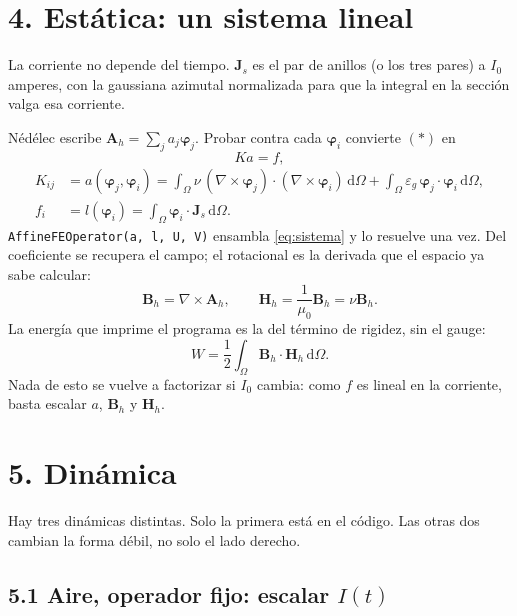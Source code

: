 \documentclass[11pt]{article}
\newcommand{\curl}{\nabla\times}
\newcommand{\nv}{\nu}
\newcommand{\eg}{\varepsilon_{g}}
\newcommand{\dV}{\,\mathrm{d}\Omega}
\begin{document}
\section*{4. Estática: un sistema lineal}

La corriente no depende del tiempo. \(\mathbf{J}_{s}\) es el par de anillos (o los tres pares) a \(I_{0}\) amperes, con la gaussiana azimutal normalizada para que la integral en la sección valga esa corriente.

Nédélec escribe \(\mathbf{A}_{h}=\sum_{j} a_{j}\boldsymbol{\varphi}_{j}\).
Probar contra cada \(\boldsymbol{\varphi}_{i}\) convierte \((\ast)\) en
\begin{equation}
Ka=f,
\label{eq:sistema}
\end{equation}
\begin{align}
K_{ij}
&=a(\boldsymbol{\varphi}_{j},\boldsymbol{\varphi}_{i})
=\int_{\Omega}\nv\,(\curl\boldsymbol{\varphi}_{j})\cdot(\curl\boldsymbol{\varphi}_{i})\dV
+\int_{\Omega}\eg\,\boldsymbol{\varphi}_{j}\cdot\boldsymbol{\varphi}_{i}\dV,
\label{eq:K}\\
f_{i}
&=l(\boldsymbol{\varphi}_{i})
=\int_{\Omega}\boldsymbol{\varphi}_{i}\cdot\mathbf{J}_{s}\dV.
\label{eq:f}
\end{align}
\texttt{AffineFEOperator(a, l, U, V)} ensambla \eqref{eq:sistema} y lo resuelve una vez. Del coeficiente se recupera el campo; el rotacional es la derivada que el espacio ya sabe calcular:
\begin{equation}
\mathbf{B}_{h}=\curl\mathbf{A}_{h},
\qquad
\mathbf{H}_{h}=\frac{1}{\mu_{0}}\mathbf{B}_{h}=\nv\mathbf{B}_{h}.
\label{eq:BH}
\end{equation}
La energía que imprime el programa es la del término de rigidez, sin el gauge:
\begin{equation}
W=\frac12\int_{\Omega}\mathbf{B}_{h}\cdot\mathbf{H}_{h}\dV.
\label{eq:energia}
\end{equation}
Nada de esto se vuelve a factorizar si \(I_{0}\) cambia: como \(f\) es lineal en la corriente, basta escalar \(a\), \(\mathbf{B}_{h}\) y \(\mathbf{H}_{h}\).

\section*{5. Dinámica}

Hay tres dinámicas distintas. Solo la primera está en el código. Las otras dos cambian la forma débil, no solo el lado derecho.

\subsection*{5.1 Aire, operador fijo: escalar \(I(t)\)}
\end{document}

